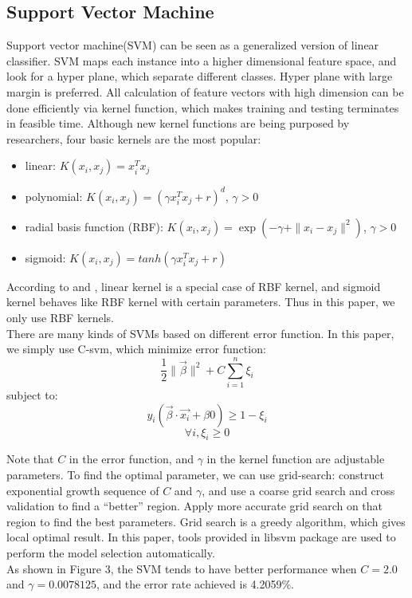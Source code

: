 \documentclass[a4paper,11pt]{article}
\begin{document}
\subsection{Support Vector Machine}
Support vector machine(SVM) can be seen as a generalized version of linear classifier. SVM maps each instance into a higher dimensional feature space, and look for a hyper plane, which separate different classes. Hyper plane with large margin is preferred. All calculation of feature vectors with high dimension can be done efficiently via kernel function, which makes training and testing terminates in feasible time. Although new kernel functions are being purposed by researchers, four basic kernels are the most popular\cite{svm}:
\begin{itemize}
\item linear: $K(x_i,x_j)=x_i^Tx_j$\\
\item polynomial: $K(x_i,x_j)=(\gamma x_i^Tx_j+r)^d$, $\gamma >0$\\
\item radial basis function (RBF): $K(x_i,x_j)=\exp(-\gamma + \|x_i-x_j\|^2)$, $\gamma > 0$\\
\item sigmoid: $K(x_i,x_j)=tanh(\gamma x_i^Tx_j+r)$\\
\end{itemize}
According to \cite{ssk} and \cite{ll}, linear kernel is a special case of RBF kernel, and sigmoid kernel behaves like RBF kernel with certain parameters. Thus in this paper, we only use RBF kernels.\\
There are many kinds of SVMs based on different error function. In this paper, we simply use C-svm, which minimize error function:
    $$\frac{1}{2}\|\vec{\beta}\|^2+C\sum_{i=1}^n \xi_i$$
 subject to:$$y_i(\vec{\beta}\cdot \vec{x_i}+\beta{0})\geq 1-\xi_i$$$$\forall i, \xi_i\geq 0$$

Note that $C$ in the error function, and $\gamma$ in the kernel function are adjustable parameters. To find the optimal parameter, we can use grid-search\cite{svm}: construct exponential growth sequence of $C$ and $\gamma$, and use a coarse grid search and cross validation to find a ``better'' region. Apply more accurate grid search on that region to find the best parameters. Grid search is a greedy algorithm, which gives local optimal result. In this paper, tools provided in libsvm\cite{libsvm} package are used to perform the model selection automatically.\\
As shown in Figure 3, the SVM tends to have better performance when $C=2.0$ and $\gamma=0.0078125$, and the error rate achieved is 4.2059\%.
\end{document}

